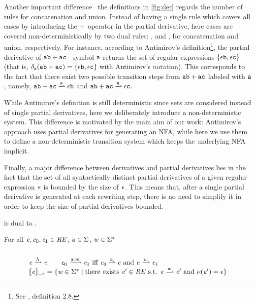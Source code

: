 Another important difference \wrt\ the definitions in \cref{fig:der} regards the number of rules for concatenation and union. Instead of having a single rule which covers all cases by introducing the $\mathbin{+}$ operator in the partial derivative, here cases are covered non-deterministically by two dual rules: ,  and ,   for concatenation and union, respectively.
For instance, according to Antimirov's definition\footnote{See \cite{Antimirov96}, definition 2.8.},
the partial derivative of $\mathtt {a} \mathtt {b} \mathbin{+} \mathtt {a}\mathtt {c}$ \wrt~symbol $\mathtt {a} $ returns the set of regular expressions $\{\mathtt {\epsilon}\mathtt {b},\mathtt {\epsilon}\mathtt {c}\}$ (that is, $\delta_{\mathtt {a}}(\mathtt {a}\mathtt {b} \mathbin{+} \mathtt {a}\mathtt {c})=\{\mathtt {\epsilon}\mathtt {b},\mathtt {\epsilon}\mathtt {c}\}$ with Antimirov's notation). This corresponds to the fact that there exist two possible transition steps from $\mathtt {a} \mathtt {b} \mathbin{+} \mathtt {a}\mathtt {c}$ labeled with $\mathtt {a} $, namely,
$\sym \asym \orop \sym\yasym\parDer{\sym}\eps\catop\asym$ and $\sym \asym \orop \sym \yasym\parDer{\sym}\eps\catop\yasym$.

While Antimirov's definition is still deterministic since sets  are considered instead of single partial derivatives, here we deliberately introduce a non-deterministic system.
This difference is motivated by the main aim of our work: Antimirov's approach uses partial derivatives for generating an NFA, while here
we use them to define a non-deterministic transition system which keeps the underlying NFA implicit.

Finally, a major difference between derivatives and partial derivatives
lies in the fact that the set of all syntactically distinct partial derivatives of a given regular expression $\mathit {e}$ is bounded by the size of $\mathit {e}$. This means that, after a single partial derivative is generated at each rewriting step, there is no need to simplify it in order to keep the size of partial derivatives bounded.

 is dual to .
\begin{definition}\label{def:parDer}
 For all $\mathit {e},\mathit {e}_0,\mathit {e}_1\in\mathit {RE}$, $\mathtt {a}\in\Sigma$, $\mathit {w}\in\Sigma^*$
 \[
  \begin{array}{l}
   \\
   \re\parDer{\emptyWord}\re                                                                                       \qquad
   \re_0\parDer{\sym\strcons\word}\re_1 \mbox{ iff } \re_0\parDer{\sym}{}\re \mbox{ and } \re\parDer{\word}{}\re_1 \\
   \opSem{\re}{\parDer{}}=\{\word\in\symAlph^* \mid \mbox{there exists } \re'\in\reSet \mbox{ s.t. } \re\parDer{\word}\re' \mbox{ and } \hasEps{\re'}=\eps\}
  \end{array}
 \]
\end{definition}

